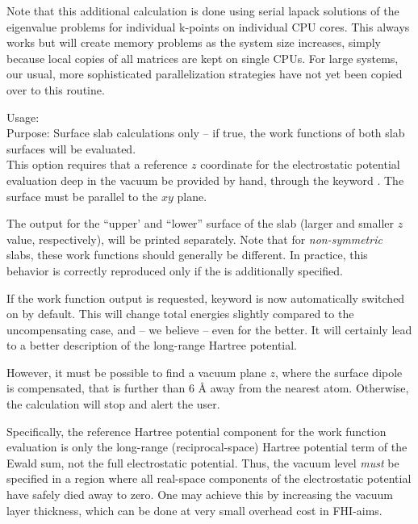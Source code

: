 Note that this additional calculation is done using serial lapack solutions
of the eigenvalue problems for individual k-points on individual CPU cores.
This always works but will create memory problems as the system size increases,
simply because local copies of all matrices are kept on single CPUs. For large
systems, our usual, more sophisticated parallelization strategies have not yet
been copied over to this routine.

{
  \noindent
  Usage:   \\[1.0ex]
  Purpose: Surface slab calculations only -- if true, the work functions of
  both slab surfaces will be evaluated.
 \\[1.0ex]
}
%
This option requires that a reference $z$ coordinate for the electrostatic
potential evaluation deep in the vacuum be provided by hand, through the
keyword . The surface must be parallel to the $xy$
plane.

The output for the ``upper' and ``lower'' surface of the slab (larger and
smaller $z$ value, respectively), will be printed separately. Note that for
\emph{non-symmetric} slabs, these work functions should generally be
different. In practice, this behavior is correctly reproduced only if the
 is additionally specified.

If the work function output is requested, keyword
 is now automatically switched
on by default. This will change total energies slightly compared to
the uncompensating case, and -- we believe -- even for the better. It will
certainly lead to a better description of the long-range Hartree potential.

However, it must be possible to find a vacuum plane $z$, where the
surface dipole is compensated, that is further than 6 {\AA} away from
the nearest atom. Otherwise, the calculation will stop and alert the user.

Specifically, the reference Hartree potential component for the work function
evaluation is only the long-range (reciprocal-space) Hartree potential term of
the Ewald sum, not the full electrostatic potential. Thus, the vacuum level
\emph{must} be specified in a region where all real-space components of the
electrostatic potential have safely died away to zero. One may achieve this by
increasing the vacuum layer thickness, which can be done at very small
overhead cost in FHI-aims.

